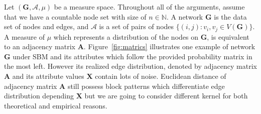 \documentclass[12pt]{article}
\theoremstyle{definition}
\begin{document}
Let $(\mathbf{G}, \mathcal{A}, \mu)$ be a measure space. Throughout all of the arguments, assume that we have a countable node set with size of $n \in \mathbb{N}$. A network $\mathbf{G}$ is the data set of nodes and edges, and $\mathcal{A}$ is a set of pairs of nodes $\{(i,j) : v_{i}, v_{j} \in V(\mathbf{G}) \}$. A measure of $\mu$ which represents a distribution of the nodes on $\mathbf{G}$, is equivalent to an adjacency matrix $\mathbf{A}$. Figure~\ref{fig:matrics} illustrates one example of network $\mathbf{G}$ under SBM and its attributes which follow the provided probability matrix in the most left. However its realized edge distribution, denoted by adjacency matrix $\mathbf{A}$ and its attribute values $\mathbf{X}$ contain lots of noise. Euclidean distance of adjacency matrix $\mathbf{A}$ still possess block patterns which differentiate edge distribution depending $\mathbf{X}$ but we are going to consider different kernel for both theoretical and empirical reasons. 
	
\end{document}
